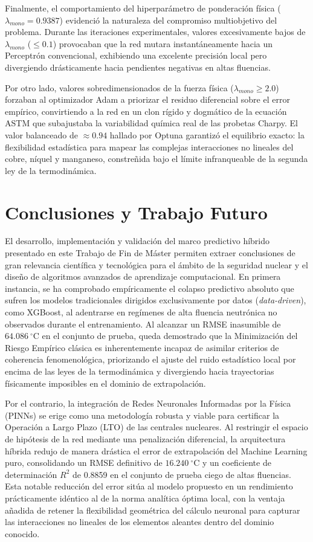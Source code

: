 \documentclass[a4paper, 12pt, twocolumn]{book}
\begin{document}
Finalmente, el comportamiento del hiperparámetro de ponderación física ($\lambda_{mono} = 0.9387$) evidenció la naturaleza del compromiso multiobjetivo del problema. Durante las iteraciones experimentales, valores excesivamente bajos de $\lambda_{mono}$ ($\le 0.1$) provocaban que la red mutara instantáneamente hacia un Perceptrón convencional, exhibiendo una excelente precisión local pero divergiendo drásticamente hacia pendientes negativas en altas fluencias. 

Por otro lado, valores sobredimensionados de la fuerza física ($\lambda_{mono} \ge 2.0$) forzaban al optimizador Adam a priorizar el residuo diferencial sobre el error empírico, convirtiendo a la red en un clon rígido y dogmático de la ecuación ASTM que subajustaba la variabilidad química real de las probetas Charpy. El valor balanceado de $\approx 0.94$ hallado por Optuna garantizó el equilibrio exacto: la flexibilidad estadística para mapear las complejas interacciones no lineales del cobre, níquel y manganeso, constreñida bajo el límite infranqueable de la segunda ley de la termodinámica.

\chapter{Conclusiones y Trabajo Futuro}

El desarrollo, implementación y validación del marco predictivo híbrido presentado en este Trabajo de Fin de Máster permiten extraer conclusiones de gran relevancia científica y tecnológica para el ámbito de la seguridad nuclear y el diseño de algoritmos avanzados de aprendizaje computacional. En primera instancia, se ha comprobado empíricamente el colapso predictivo absoluto que sufren los modelos tradicionales dirigidos exclusivamente por datos (\textit{data-driven}), como XGBoost, al adentrarse en regímenes de alta fluencia neutrónica no observados durante el entrenamiento. Al alcanzar un RMSE inasumible de $64.086\ ^\circ\text{C}$ en el conjunto de prueba, queda demostrado que la Minimización del Riesgo Empírico clásica es inherentemente incapaz de asimilar criterios de coherencia fenomenológica, priorizando el ajuste del ruido estadístico local por encima de las leyes de la termodinámica y divergiendo hacia trayectorias físicamente imposibles en el dominio de extrapolación.

Por el contrario, la integración de Redes Neuronales Informadas por la Física (PINNs) se erige como una metodología robusta y viable para certificar la Operación a Largo Plazo (LTO) de las centrales nucleares. Al restringir el espacio de hipótesis de la red mediante una penalización diferencial, la arquitectura híbrida redujo de manera drástica el error de extrapolación del Machine Learning puro, consolidando un RMSE definitivo de $16.240\ ^\circ\text{C}$ y un coeficiente de determinación $R^2$ de 0.8859 en el conjunto de prueba ciego de altas fluencias. Esta notable reducción del error sitúa al modelo propuesto en un rendimiento prácticamente idéntico al de la norma analítica óptima local, con la ventaja añadida de retener la flexibilidad geométrica del cálculo neuronal para capturar las interacciones no lineales de los elementos aleantes dentro del dominio conocido.
\end{document}
